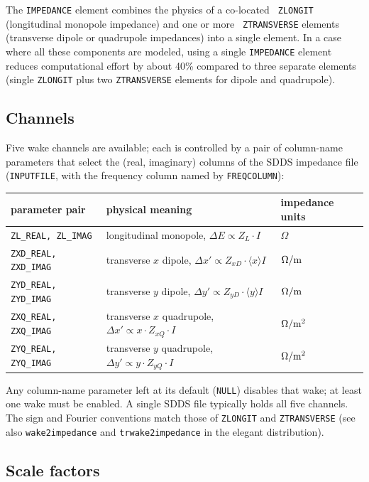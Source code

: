 The {\tt IMPEDANCE} element combines the physics of a co-located {\tt
ZLONGIT} (longitudinal monopole impedance) and one or more {\tt
ZTRANSVERSE} elements (transverse dipole or quadrupole
impedances) into a single element.  In a case where all these components
are modeled, using a single \verb|IMPEDANCE| element reduces computational
effort by about 40\% compared to three separate elements (single \verb|ZLONGIT|
plus two \verb|ZTRANSVERSE| elements for dipole and quadrupole).

\subsection*{Channels}

Five wake channels are available; each is controlled by a pair of
column-name parameters that select the (real, imaginary) columns of
the SDDS impedance file ({\tt INPUTFILE}, with the frequency column
named by {\tt FREQCOLUMN}):
\begin{center}
\begin{tabular}{lll}
\hline
parameter pair               & physical meaning & impedance units \\\hline
{\tt ZL\_REAL,  ZL\_IMAG}   & longitudinal monopole, $\Delta E \propto Z_L \cdot I$  & $\Omega$         \\
{\tt ZXD\_REAL, ZXD\_IMAG} & transverse $x$ dipole, $\Delta x' \propto Z_{xD}\cdot \langle x \rangle I$ & $\Omega/{\rm m}$ \\
{\tt ZYD\_REAL, ZYD\_IMAG} & transverse $y$ dipole, $\Delta y' \propto Z_{yD}\cdot \langle y \rangle I$ & $\Omega/{\rm m}$ \\
{\tt ZXQ\_REAL, ZXQ\_IMAG} & transverse $x$ quadrupole, $\Delta x' \propto x\cdot Z_{xQ}\cdot I$    & $\Omega/{\rm m}^2$ \\
{\tt ZYQ\_REAL, ZYQ\_IMAG} & transverse $y$ quadrupole, $\Delta y' \propto y\cdot Z_{yQ}\cdot I$    & $\Omega/{\rm m}^2$ \\
\hline
\end{tabular}
\end{center}
Any column-name parameter left at its default ({\tt NULL}) disables
that wake; at least one wake must be enabled.  A single SDDS file
typically holds all five channels.  The sign and Fourier conventions
match those of {\tt ZLONGIT} and {\tt ZTRANSVERSE} (see also
\verb|wake2impedance| and \verb|trwake2impedance| in the elegant
distribution).

\subsection*{Scale factors}

